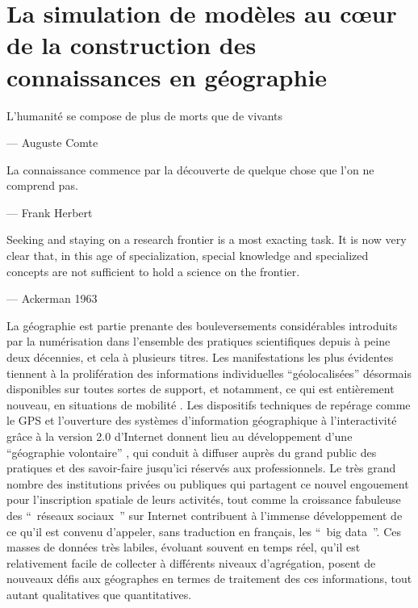 \graphicspath{{FigureIntroduction/}}

\chapter{La simulation de modèles au cœur de la construction des connaissances en géographie}

\startcontents[chapters]
\Mprintcontents


\epigraph {L'humanité se compose de plus de morts que de vivants } { --- \textup{Auguste Comte}}

\epigraph {La connaissance commence par la découverte de quelque chose que l'on ne comprend pas.  } { --- \textup{Frank Herbert}}

\epigraph {Seeking and staying on a research frontier is a most exacting task. It is now very clear that, in this age of specialization, special knowledge and specialized concepts are not sufficient to hold a science on the frontier.}{ --- \textup{Ackerman 1963}}


La géographie est partie prenante des bouleversements considérables introduits par la numérisation dans l’ensemble des pratiques scientifiques depuis à peine deux décennies, et cela à plusieurs titres. Les manifestations les plus évidentes tiennent à la prolifération des informations individuelles \enquote{géolocalisées} désormais disponibles sur toutes sortes de support, et notamment, ce qui est entièrement nouveau, en situations de mobilité \autocite{FenChong2012}. Les dispositifs techniques de repérage comme le GPS et l’ouverture des systèmes d’information géographique à l’interactivité grâce à la version 2.0 d’Internet donnent lieu au développement d’une \enquote{géographie volontaire} \autocite{Goodchild2007}, qui conduit à diffuser auprès du grand public des pratiques et des savoir-faire jusqu’ici réservés aux professionnels. Le très grand nombre des institutions privées ou publiques qui partagent ce nouvel engouement pour l’inscription spatiale de leurs activités, tout comme la croissance fabuleuse des \enquote{ réseaux sociaux } sur Internet  contribuent à l’immense développement de ce qu’il est convenu d’appeler, sans traduction en français, les \enquote{ big data }. Ces masses de données très labiles, évoluant souvent en temps réel, qu’il est relativement facile de collecter à différents niveaux d’agrégation, posent de nouveaux défis aux géographes en termes de traitement des ces informations, tout autant qualitatives que quantitatives. 


